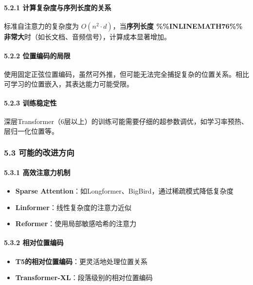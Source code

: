 \documentclass[11pt,a4paper]{article}
\begin{document}
\paragraph{5.2.1 计算复杂度与序列长度的关系}

标准自注意力的复杂度为 $O(n^2 \cdot d)$，当\textbf{序列长度 \%\%INLINEMATH76\%\% 非常大}时（如长文档、音频信号），计算成本显著增加。

\paragraph{5.2.2 位置编码的局限}

使用固定正弦位置编码，虽然可外推，但可能无法完全捕捉复杂的位置关系。相比可学习的位置嵌入，其表达能力可能受限。

\paragraph{5.2.3 训练稳定性}

深层Transformer（6层以上）的训练可能需要仔细的超参数调优，如学习率预热、层归一化位置等。

\subsubsection*{5.3 可能的改进方向}

\paragraph{5.3.1 高效注意力机制}

\begin{itemize}
  \item \textbf{Sparse Attention}：如Longformer、BigBird，通过稀疏模式降低复杂度
  \item \textbf{Linformer}：线性复杂度的注意力近似
  \item \textbf{Reformer}：使用局部敏感哈希的注意力
\end{itemize}

\paragraph{5.3.2 相对位置编码}

\begin{itemize}
  \item \textbf{T5的相对位置编码}：更灵活地处理位置关系
  \item \textbf{Transformer-XL}：段落级别的相对位置编码
\end{itemize}
\end{document}

